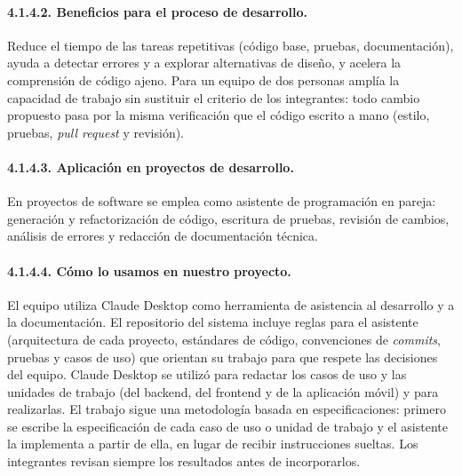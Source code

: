 \paragraph{4.1.4.2. Beneficios para el proceso de desarrollo.}

Reduce el tiempo de las tareas repetitivas (código base, pruebas, documentación), ayuda a detectar errores y a explorar alternativas de diseño, y acelera la comprensión de código ajeno. Para un equipo de dos personas amplía la capacidad de trabajo sin sustituir el criterio de los integrantes: todo cambio propuesto pasa por la misma verificación que el código escrito a mano (estilo, pruebas, \textit{pull request} y revisión).

\paragraph{4.1.4.3. Aplicación en proyectos de desarrollo.}

En proyectos de software se emplea como asistente de programación en pareja: generación y refactorización de código, escritura de pruebas, revisión de cambios, análisis de errores y redacción de documentación técnica.

\paragraph{4.1.4.4. Cómo lo usamos en nuestro proyecto.}

El equipo utiliza Claude Desktop como herramienta de asistencia al desarrollo y a la documentación. El repositorio del sistema incluye reglas para el asistente (arquitectura de cada proyecto, estándares de código, convenciones de \textit{commits}, pruebas y casos de uso) que orientan su trabajo para que respete las decisiones del equipo. Claude Desktop se utilizó para redactar los casos de uso y las unidades de trabajo (del backend, del frontend y de la aplicación móvil) y para realizarlas. El trabajo sigue una metodología basada en especificaciones: primero se escribe la especificación de cada caso de uso o unidad de trabajo y el asistente la implementa a partir de ella, en lugar de recibir instrucciones sueltas. Los integrantes revisan siempre los resultados antes de incorporarlos.
